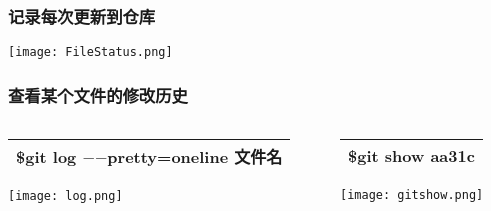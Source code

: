 \documentclass[notheorems,mathserif,table,compress]{beamer}  %
\begin{document}



\begin{frame}
  \frametitle{记录每次更新到仓库}
  \centering\texttt{[image: FileStatus.png]}
\end{frame}


\begin{frame}
  \frametitle{查看某个文件的修改历史}
  \begin{tcolorbox}[colback=blue!5,colframe=blue!75!black] 
  \begin{columns}
  \begin{column}{0.5\textwidth}
  \begin{center}
  \begin{tabular}{|l|}
  \hline
  \$git log $-$$-$pretty=oneline 文件名\\
  \hline
  \end{tabular}
  \texttt{[image: log.png]}
  \end{center}
  \end{column}

  \begin{column}{0.5\textwidth}
  \begin{center}
  \begin{tabular}{|l|}
  \hline
  \$git show aa31c\\
  \hline
  \end{tabular}
  \texttt{[image: gitshow.png]}
  \end{center}
  \end{column}
  \end{columns}
  \end{tcolorbox}
\end{frame}
\end{document}
